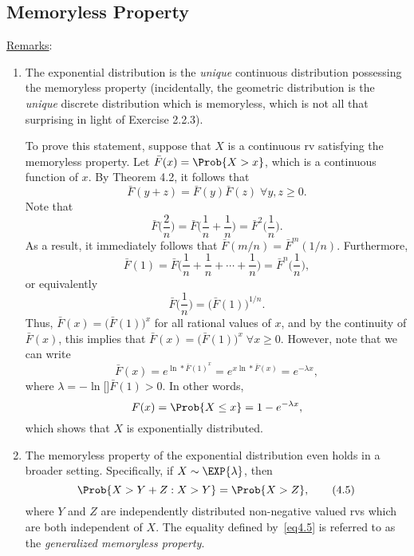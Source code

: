 \subsection*{Memoryless Property}
\underline{Remarks}:
\begin{enumerate}[(1)]
    \item The exponential distribution is the \emph{unique} continuous distribution possessing the
          memoryless property (incidentally, the geometric distribution is the \emph{unique} discrete
          distribution which is memoryless, which is not all that surprising in light of Exercise 2.2.3).

          To prove this statement, suppose that $ X $ is a continuous rv satisfying the memoryless property. Let $ \bar{F}(x)=\Prob{X>x} $,
          which is a continuous function of $ x $. By Theorem 4.2, it follows that
          \[ \bar{F}(y+z)=\bar{F}(y)\bar{F}(z)\; \forall y,z\ge 0. \]
          Note that
          \[ \bar{F}\biggl(\frac{2}{n}\biggr)=\bar{F}\biggl(\frac{1}{n}+\frac{1}{n}\biggr)=\bar{F}^2\biggl(\frac{1}{n}\biggr). \]
          As a result, it immediately follows that $ \bar{F}(m/n)=\bar{F}^m(1/n) $. Furthermore,
          \[ \bar{F}(1)=\bar{F}\biggl(\frac{1}{n}+\frac{1}{n}+\cdots+\frac{1}{n}\biggr)=\bar{F}^n\biggl(\frac{1}{n}\biggr), \]
          or equivalently
          \[ \bar{F}\biggl(\frac{1}{n}\biggr)=\bigl(\bar{F}(1)\bigr)^{1/n}. \]
          Thus, $ \bar{F}(x)=\bigl(\bar{F}(1)\bigr)^x $ for all rational values of $ x $, and by the continuity of $ \bar{F}(x) $,
          this implies that $ \bar{F}(x)=\bigl(\bar{F}(1)\bigr)^x\; \forall x\ge 0 $. However, note that we can write
          \[ \bar{F}(x)=e^{\ln*{\bar{F}(1)}^x}=e^{x\ln*{\bar{F}(x)}}=e^{-\lambda x}, \]
          where $ \lambda=-\ln[\big]{\bar{F}(1)}>0 $. In other words,
          \[ F(x)=\Prob{X\le x}=1-e^{-\lambda x}, \]
          which shows that $ X $ is exponentially distributed.
    \item The memoryless property of the exponential distribution even holds in a broader setting. Specifically, if $ X \sim \EXP{\lambda} $,
          then
          \[ \Prob{X>Y+Z\given X>Y}=\Prob{X>Z},\tag*{(4.5)}\label{eq4.5} \]
          where $Y$ and $Z$ are independently distributed non-negative valued rvs which are both
          independent of $X$. The equality defined by~\ref{eq4.5} is referred to as the \emph{generalized
              memoryless property}.


\end{enumerate}
